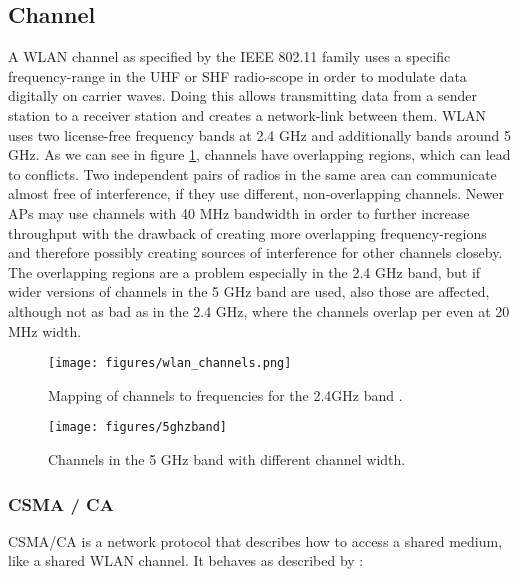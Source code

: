   \subsection{Channel}
    A \ac{WLAN} channel as specified by the IEEE 802.11 family uses a specific frequency-range in the \ac{UHF} or \ac{SHF} radio-scope in order 
    to modulate data digitally on carrier waves.
    Doing this allows transmitting data from a sender station to a receiver station and creates a network-link between them.
    \ac{WLAN} uses two license-free frequency bands at 2.4 GHz and additionally bands around 5 GHz.
    As we can see in figure \ref{fig:wlan_channels}, channels have overlapping regions, which can lead to conflicts.
    Two independent pairs of radios in the same area can communicate almost free of interference, if they use different, non-overlapping channels.
    Newer APs may use channels with 40 MHz bandwidth in order to further increase throughput with the drawback of creating more overlapping frequency-regions
    and therefore possibly creating sources of interference for other channels closeby.
    The overlapping regions are a problem especially in the 2.4 GHz band, but if wider versions of channels in the 5 GHz band are used, also those are affected,
    although not as bad as in the 2.4 GHz, where the channels overlap per even at 20 MHz width.
    
    \begin{figure}[bh!]
      \centering
      \texttt{[image: figures/wlan\_channels.png]}
      \caption{Mapping of channels to frequencies for the 2.4GHz band \cite{wlan_channels}.}
      \label{fig:wlan_channels}
    \end{figure}
    
    \begin{figure}[bh!]
      \centering
      \texttt{[image: figures/5ghzband]}
      \caption{Channels in the 5 GHz band with different channel width.}
      \label{fig:5ghzband}
    \end{figure}
    
      \subsubsection{CSMA / CA}
	\ac{CSMA/CA} is a network protocol that describes how to access a shared medium, like a shared \ac{WLAN} channel.
	It behaves as described by \cite{csma_techo}:
	
